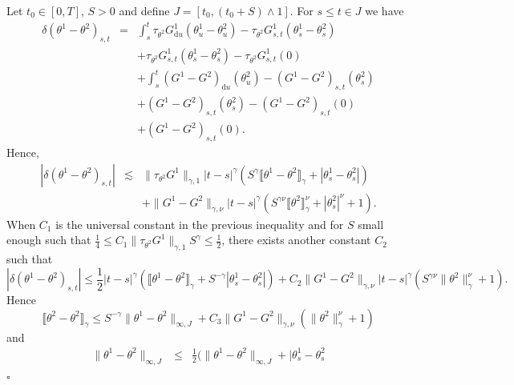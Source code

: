 \documentclass[a4paper,11pt]{article}
\newcommand{\mathd}{\mathrm{d}}
\newenvironment{proof}{{\sc Proof.}}{\hfill$\square$}
\begin{document}
\begin{proof}
  Let $t_{0} \in [ 0,T ]$, $S>0$ and define $J= [ t_{0} , ( t_{0} +S ) \wedge
  1 ]$. For $s \leqslant t \in J$ we have
  \begin{eqnarray*}
    \delta ( \theta^{1} - \theta^{2} )_{s,t} & = & \int_{s}^{t}
    \tau_{\theta^{2}} G^{1}_{\mathd u} ( \theta^{1}_{u} - \theta^{2}_{u} ) -
    \tau_{\theta^{2}} G^{1}_{s,t} ( \theta^{1}_{s} - \theta^{2}_{s} )\\
    &  & + \tau_{\theta^{2}} G^{1}_{s,t} ( \theta^{1}_{s} - \theta^{2}_{s} )
    - \tau_{\theta^{2}} G^{1}_{s,t} ( 0 )\\
    &  & + \int_{s}^{t} ( G^{1} -G^{2} )_{\mathd u} ( \theta^{2}_{u} ) - (
    G^{1} -G^{2} )_{s,t} ( \theta^{2}_{s} )\\
    &  & + ( G^{1} -G^{2} )_{s,t} ( \theta^{2}_{s} ) - ( G^{1} -G^{2} )_{s,t}
    ( 0 )\\
    &  & + ( G^{1} -G^{2} )_{s,t} ( 0 ).
  \end{eqnarray*}
  Hence,
  \begin{eqnarray*}
    | \delta ( \theta^{1} - \theta^{2} )_{s,t} | & \lesssim & \|
    \tau_{\theta^{2}} G^{1} \|_{\gamma ,1} | t-s |^{\gamma} ( S^{\gamma}
    \llbracket \theta^{1} - \theta^{2} \rrbracket_{\gamma} + | \theta^{1}_{s}
    - \theta^{2}_{s} | )\\
    &  & + \| G^{1} -G^{2} \|_{\gamma , \nu} | t-s |^{\gamma} ( S^{\gamma
    \nu} \llbracket \theta^{2} \rrbracket_{\gamma}^{\nu} + | \theta^{2}_{s}
    |^{\nu} +1 ) .
  \end{eqnarray*}
  When $C_{1}$ is the universal constant in the previous inequality and for
  $S$ small enough such that $\frac{1}{4} \leqslant C_{1} \| \tau_{\theta^{2}}
  G^{1} \|_{\gamma ,1} S^{\gamma} \leqslant \frac{1}{2}$, there exists another constant $C_{2}$ such that
  \[ | \delta ( \theta^{1} - \theta^{2} )_{s,t} | \leqslant \frac{1}{2} | t-s
     |^{\gamma} ( \llbracket \theta^{1} - \theta^{2} \rrbracket_{\gamma} +S^{-
     \gamma} | \theta^{1}_{s} - \theta^{2}_{s} | ) +C_{2} \| G^{1} -G^{2}
     \|_{\gamma , \nu} | t-s |^{\gamma} ( S^{\gamma \nu} \| \theta^{2}
     \|^{\nu}_{\gamma} +1 ) . \]
  Hence
  \[ \llbracket \theta^{2} - \theta^{2} \rrbracket_{\gamma} \leqslant S^{-
     \gamma} \| \theta^{1} - \theta^{2} \|_{\infty ,J} +C_{3} \| G^{1} -G^{2}
     \|_{\gamma , \nu} ( \| \theta^{2} \|^{\nu}_{\gamma} +1 ) \]
  and
  \begin{eqnarray*}
    \| \theta^{1} - \theta^{2} \|_{\infty ,J} & \leqslant & \frac{1}{2} ( \|
    \theta^{1} - \theta^{2} \|_{\infty ,J} + | \theta^{1}_{s} - \theta^{2}_{s}

\end{eqnarray*}
\end{proof}
\end{document}
